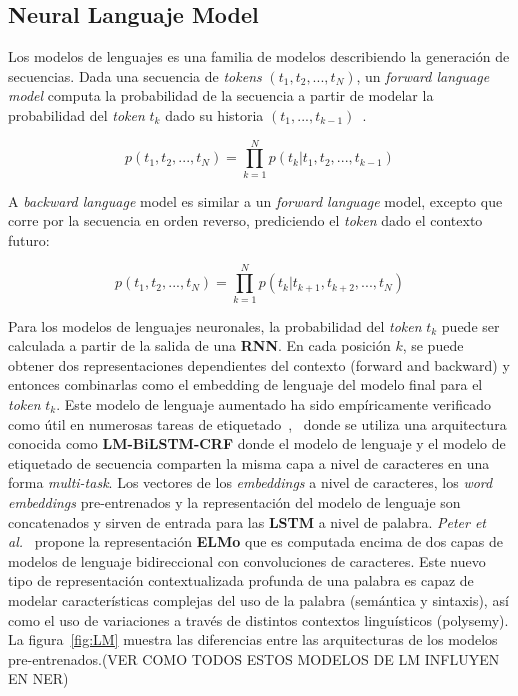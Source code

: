 \subsection{Neural Languaje Model}

Los modelos de lenguajes es una familia de modelos describiendo la generaci\'on de secuencias. Dada una secuencia de \emph{tokens} $(t_1, t_2, ..., t_N)$, un \emph{forward language model} computa la probabilidad de la secuencia a partir de modelar la probabilidad del \emph{token} $t_k$ dado su historia $(t_1,...,t_{k-1})$~\cite{peters2017semi}.

\begin{equation}
	p(t_1, t_2, ..., t_N) = \prod_{k=1}^{N} p(t_k | t_1, t_2, ..., t_{k-1})
\end{equation}


A \emph{backward language} model es similar a un \emph{forward language} model, excepto que corre por la secuencia en orden reverso, prediciendo el \emph{token} dado el contexto futuro:

\begin{equation}
p(t_1, t_2, ..., t_N) = \prod_{k=1}^{N} p(t_k | t_{k + 1}, t_{k + 2}, ..., t_N)
\end{equation}

Para los modelos de lenguajes neuronales, la probabilidad del \emph{token} $t_k$ puede ser calculada a partir de la salida de una \textbf{RNN}. En cada posici\'on $k$, se puede obtener dos representaciones dependientes del contexto (forward and backward) y entonces combinarlas como el embedding de lenguaje del modelo final para el \emph{token} $t_k$. Este modelo de lenguaje aumentado ha sido emp\'iricamente verificado como \'util en numerosas tareas de etiquetado~\cite{liu2018efficient},~\cite{liu2018empower} donde se utiliza una arquitectura conocida como \textbf{LM-BiLSTM-CRF} donde el modelo de lenguaje y el modelo de etiquetado de secuencia comparten la misma capa a nivel de caracteres en una forma \emph{multi-task}. Los vectores de los \emph{embeddings} a nivel de caracteres, los \emph{word embeddings} pre-entrenados y la representaci\'on del modelo de lenguaje son concatenados y sirven de entrada para las \textbf{LSTM} a nivel de palabra. \emph{Peter et al.}~\cite{peters2018deep} propone la representaci\'on \textbf{ELMo} que es computada encima de dos capas de modelos de lenguaje bidireccional con convoluciones de caracteres. Este nuevo tipo de representaci\'on contextualizada profunda de una palabra es capaz de modelar caracter\'isticas complejas del uso de la palabra (sem\'antica y sintaxis), as\'i como el uso de variaciones a trav\'es de distintos contextos lingu\'isticos (polysemy). La figura~\ref{fig:LM} muestra las diferencias entre las arquitecturas de los modelos pre-entrenados.(VER COMO TODOS ESTOS MODELOS DE LM INFLUYEN EN NER)

